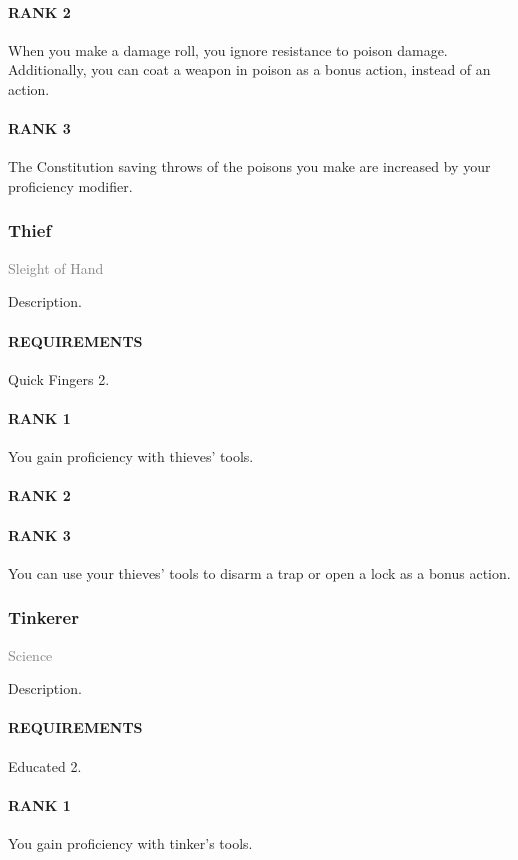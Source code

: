 \paragraph{RANK 2} When you make a damage roll, you ignore resistance to poison damage.
Additionally, you can coat a weapon in poison as a bonus action, instead of an action.
\paragraph{RANK 3} The Constitution saving throws of the poisons you make are increased by your proficiency modifier.

\subsubsection{Thief} \label{feat::thief}
\small{\textcolor{gray}{Sleight of Hand}}

\normalsize
Description.
\paragraph{REQUIREMENTS} Quick Fingers 2.
\paragraph{RANK 1} You gain proficiency with thieves' tools.
\paragraph{RANK 2}
\paragraph{RANK 3} You can use your thieves' tools to disarm a trap or open a lock as a bonus action.

\subsubsection{Tinkerer} \label{feat::tinkerer}
\small{\textcolor{gray}{Science}}

\normalsize
Description.
\paragraph{REQUIREMENTS} Educated 2.
\paragraph{RANK 1} You gain proficiency with tinker's tools.
